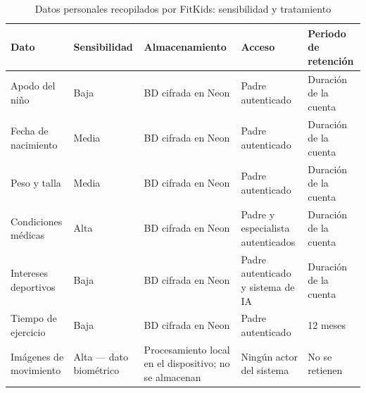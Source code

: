 					\begin{table}[H]
						\centering
						\small
						\caption{Datos personales recopilados por FitKids: sensibilidad y tratamiento}
						\label{tab:datos_privacidad}
						\begin{tabular}{p{2.0cm}p{2.0cm}p{2.8cm}p{2.8cm}p{3.4cm}}
							\hline
							\textbf{Dato} & \textbf{Sensibilidad} & \textbf{Almacenamiento} & \textbf{Acceso} & \textbf{Periodo de retención} \\
							\hline
							Apodo del niño & Baja & BD cifrada en Neon & Padre autenticado & Duración de la cuenta \\
							
							Fecha de nacimiento & Media & BD cifrada en Neon & Padre autenticado & Duración de la cuenta \\
							
							Peso y talla & Media & BD cifrada en Neon & Padre autenticado & Duración de la cuenta \\
							
							Condiciones médicas & Alta & BD cifrada en Neon & Padre y especialista autenticados & Duración de la cuenta \\
							
							Intereses deportivos & Baja & BD cifrada en Neon & Padre autenticado y sistema de IA & Duración de la cuenta \\
							
							Tiempo de ejercicio & Baja & BD cifrada en Neon & Padre autenticado & 12 meses \\
							
							Imágenes de movimiento & Alta --- dato biométrico & Procesamiento local en el dispositivo; no se almacenan & Ningún actor del sistema & No se retienen \\
							\hline
						\end{tabular}
					\end{table}
					\tblnote
					
